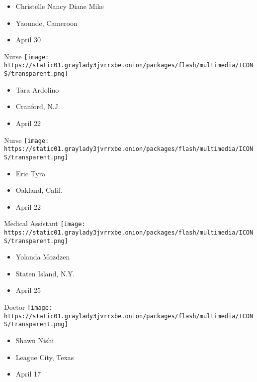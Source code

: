 \begin{itemize}
\tightlist
\item
  Christelle Nancy Diane Mike
\item
  Yaounde, Cameroon
\item
  April 30
\end{itemize}

\protect\hyperlink{item-tara-ardolino}{}

Nurse
\texttt{[image: https://static01.graylady3jvrrxbe.onion/packages/flash/multimedia/ICONS/transparent.png]}

\begin{itemize}
\tightlist
\item
  Tara Ardolino
\item
  Cranford, N.J.
\item
  April 22
\end{itemize}

\protect\hyperlink{item-eric-tyra}{}

Nurse
\texttt{[image: https://static01.graylady3jvrrxbe.onion/packages/flash/multimedia/ICONS/transparent.png]}

\begin{itemize}
\tightlist
\item
  Eric Tyra
\item
  Oakland, Calif.
\item
  April 22
\end{itemize}

\protect\hyperlink{item-yolanda-mozdzen}{}

Medical Assistant
\texttt{[image: https://static01.graylady3jvrrxbe.onion/packages/flash/multimedia/ICONS/transparent.png]}

\begin{itemize}
\tightlist
\item
  Yolanda Mozdzen
\item
  Staten Island, N.Y.
\item
  April 25
\end{itemize}

\protect\hyperlink{item-shawn-nishi}{}

Doctor
\texttt{[image: https://static01.graylady3jvrrxbe.onion/packages/flash/multimedia/ICONS/transparent.png]}

\begin{itemize}
\tightlist
\item
  Shawn Nishi
\item
  League City, Texas
\item
  April 17
\end{itemize}


